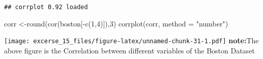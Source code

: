 \documentclass[
]{article}
\newenvironment{Shaded}{\begin{snugshade}}{\end{snugshade}}
\newcommand{\AttributeTok}[1]{\textcolor[rgb]{0.77,0.63,0.00}{#1}}
\newcommand{\DecValTok}[1]{\textcolor[rgb]{0.00,0.00,0.81}{#1}}
\newcommand{\FunctionTok}[1]{\textcolor[rgb]{0.00,0.00,0.00}{#1}}
\newcommand{\NormalTok}[1]{#1}
\newcommand{\OtherTok}[1]{\textcolor[rgb]{0.56,0.35,0.01}{#1}}
\newcommand{\SpecialCharTok}[1]{\textcolor[rgb]{0.00,0.00,0.00}{#1}}
\newcommand{\StringTok}[1]{\textcolor[rgb]{0.31,0.60,0.02}{#1}}
\begin{document}
\begin{verbatim}
## corrplot 0.92 loaded
\end{verbatim}

\begin{Shaded}
\begin{Highlighting}[]
\NormalTok{corr }\OtherTok{\textless{}{-}}\FunctionTok{round}\NormalTok{(}\FunctionTok{cor}\NormalTok{(boston[}\SpecialCharTok{{-}}\FunctionTok{c}\NormalTok{(}\DecValTok{1}\NormalTok{,}\DecValTok{4}\NormalTok{)]),}\DecValTok{3}\NormalTok{)}
\FunctionTok{corrplot}\NormalTok{(corr, }\AttributeTok{method =} \StringTok{"number"}\NormalTok{)}
\end{Highlighting}
\end{Shaded}

\texttt{[image: excerse\_15\_files/figure-latex/unnamed-chunk-31-1.pdf]}
\textbf{note:}The above figure is the Correlation between different
variables of the Boston Dataset
\end{document}
